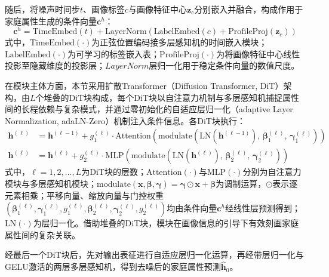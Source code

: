 随后，将噪声时间步$t$、画像标签$c$与画像特征中心$\mathbf{z}_c$分别嵌入并融合，构成作用于家庭属性生成的条件向量$\mathbf{c}^{h}$：
\begin{equation}
  \mathbf{c}^{h} = \mathrm{TimeEmbed}(t) + \mathrm{LayerNorm}\left(\mathrm{LabelEmbed}(c) + \mathrm{ProfileProj}(\mathbf{z}_c)\right)
  \label{eq.popsyn.hcond}
\end{equation}
式中，$\mathrm{TimeEmbed}(\cdot)$为正弦位置编码接多层感知机的时间嵌入模块；$\mathrm{LabelEmbed}(\cdot)$为可学习的标签嵌入表；$\mathrm{ProfileProj}(\cdot)$为将画像特征中心线性投影至隐藏维度的投影层；$LayerNorm$层归一化用于稳定条件向量的数值尺度。
 
在模块主体方面，本节采用扩散Transformer（Diffusion Transformer, DiT）架构\cite{peeblesScalableDiffusionModels2023}，由$L$个堆叠的DiT块构成，每个DiT块以自注意力机制与多层感知机捕捉属性间的长程依赖与复杂模式，并通过零初始化的自适应层归一化（adaptive Layer Normalization, adaLN-Zero）机制注入条件信息。各DiT块执行：
\begin{equation}
  \begin{aligned}
    \mathbf{h}^{(\ell)} &= \mathbf{h}^{(\ell-1)} + g_1^{(\ell)} \cdot \mathrm{Attention}\left(\mathrm{modulate}\left(\mathrm{LN}(\mathbf{h}^{(\ell-1)}),\, \boldsymbol{\beta}_1^{(\ell)},\, \boldsymbol{\gamma}_1^{(\ell)}\right)\right) \\
    \mathbf{h}^{(\ell)} &= \mathbf{h}^{(\ell)} + g_2^{(\ell)} \cdot \mathrm{MLP}\left(\mathrm{modulate}\left(\mathrm{LN}(\mathbf{h}^{(\ell)}),\, \boldsymbol{\beta}_2^{(\ell)},\, \boldsymbol{\gamma}_2^{(\ell)}\right)\right)
  \end{aligned}
  \label{eq.popsyn.ditblock}
\end{equation}
式中，$\ell = 1, 2, \ldots, L$为DiT块的层数；$\mathrm{Attention}(\cdot)$与$\mathrm{MLP}(\cdot)$分别为自注意力模块与多层感知机模块；$\mathrm{modulate}(\mathbf{x}, \boldsymbol{\beta}, \boldsymbol{\gamma}) = \boldsymbol{\gamma} \odot \mathbf{x} + \boldsymbol{\beta}$为调制运算，$\odot$表示逐元素相乘；平移向量、缩放向量与门控权重$(\boldsymbol{\beta}_1^{(\ell)}, \boldsymbol{\gamma}_1^{(\ell)}, g_1^{(\ell)}, \boldsymbol{\beta}_2^{(\ell)}, \boldsymbol{\gamma}_2^{(\ell)}, g_2^{(\ell)})$均由条件向量$\mathbf{c}^{h}$经线性层预测得到；$\mathrm{LN}(\cdot)$为层归一化。借助堆叠的DiT块，模块在画像信息的引导下有效刻画家庭属性间的复杂关联。
 
经最后一个DiT块后，先对输出表征进行自适应层归一化运算，再经带层归一化与GELU激活的两层多层感知机，得到去噪后的家庭属性预测$\hat{\mathbf{h}}_0$。
 
